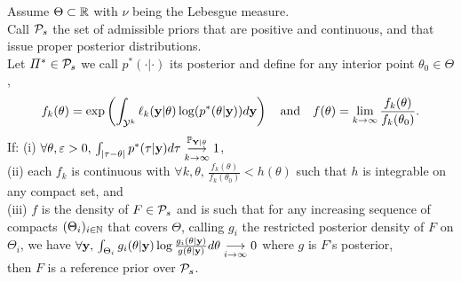 \begin{thm}\label{thm:intro-ref:explicitRP}
    Assume $\Theta\subset\RR$ with $\nu$ being the Lebesgue measure.\\
    Call $\cP_s$ the set of admissible priors that are positive and continuous, and that issue proper posterior distributions.\\
    Let $\varPi^\ast\in\cP_s$ we call $p^\ast(\cdot|\cdot)$ its posterior and define for any interior point $\theta_0\in\Theta$,
        \begin{equation}
                f_k(\theta) = \exp\left(\int_{\cY^k}\ell_k(\mbf y|\theta)\log(p^\ast(\theta|\mbf y)) d\mbf y \right) \quad\text{and}\quad  %
                f(\theta) = \lim_{k\rightarrow\infty}\frac{f_k(\theta)}{f_k(\theta_0)}.
        \end{equation}
    If: (i) $ \forall \theta,\eps>0,\,\int_{|\tau-\theta|} p^\ast(\tau|\mbf y)d\tau \conv[\PP_{\mbf Y|\theta}]{k\rightarrow\infty}1$,\\ (ii) each $f_k$ is continuous with $\forall k,\theta,\, \frac{f_k(\theta)}{f_k(\theta_0)} <h(\theta)$ such that $h$ is integrable on any compact set, and\\
    (iii) $f$ is the density of $F\in\cP_s$  and is such that for any increasing sequence of compacts $(\Theta_i)_{i\in\NN}$ that covers $\Theta$, calling $g_i$ the restricted posterior density of $F$ on $\Theta_i$, we have $\forall \mbf y,\, \int_{\Theta_i}g_i(\theta|\mbf y)\log\frac{g_i(\theta|\mbf y)}{g(\theta|\mbf y)}d\theta \conv{i\rightarrow\infty}0$ where $g$ is $F$'s posterior,\\
    then $F$ is a reference prior over $\cP_s$.
 \end{thm}


%


